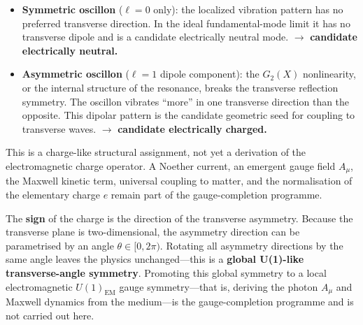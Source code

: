 \documentclass[11pt]{article}
\begin{document}
\begin{itemize}
  \item \textbf{Symmetric oscillon}
    ($\ell = 0$ only):
    the localized vibration pattern has no
    preferred transverse direction.
    In the ideal fundamental-mode limit it has no
    transverse dipole and is a candidate
    electrically neutral mode.
    $\to$ \textbf{candidate electrically neutral.}

  \item \textbf{Asymmetric oscillon}
    ($\ell = 1$ dipole component):
    the $G_2(X)$ nonlinearity, or the internal
    structure of the resonance, breaks the
    transverse reflection symmetry.  The oscillon
    vibrates ``more'' in one transverse direction
    than the opposite.  This dipolar pattern
    is the candidate geometric seed for coupling
    to transverse waves.
    $\to$ \textbf{candidate electrically charged.}
\end{itemize}

This is a charge-like structural assignment, not yet a
derivation of the electromagnetic charge operator.  A
Noether current, an emergent gauge field $A_\mu$, the
Maxwell kinetic term, universal coupling to matter, and the
normalisation of the elementary charge $e$ remain part of
the gauge-completion programme.

The \textbf{sign} of the charge is the direction
of the transverse asymmetry.
Because the transverse plane is two-dimensional,
the asymmetry direction can be parametrised by
an angle $\theta \in [0, 2\pi)$.  Rotating all
asymmetry directions by the same angle leaves the
physics unchanged---this is a \textbf{global
U(1)-like transverse-angle symmetry}.  Promoting this
global symmetry to a local electromagnetic
$U(1)_{\mathrm{EM}}$ gauge symmetry---that is, deriving the
photon $A_\mu$ and Maxwell dynamics from the medium---is the
gauge-completion programme and is not carried out here.
\end{document}
